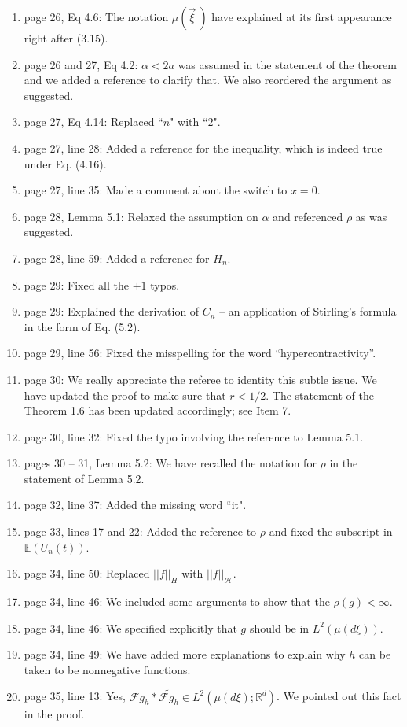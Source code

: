 \documentclass[12pt]{article}%
\theoremstyle{plain}
\theoremstyle{definition}
\def\R{\mathbb{R}}
\newcommand{\Norm}[1]{\left|\left|  #1   \right|\right|}
\numberwithin{equation}{section}
\begin{document}
\begin{enumerate}
  \item[53.] page 26, Eq 4.6: The notation $\mu(\vec{\xi}\:)$ have explained at
    its first appearance right after (3.15).

  \item[54.] page 26 and 27, Eq 4.2: $\alpha < 2a$ was assumed in the statement
    of the theorem and we added a reference to clarify that. We also reordered
    the argument as suggested.
  \item[55.] page 27, Eq 4.14: Replaced ``$n$" with ``$2$".
  \item[56.] page 27, line 28: Added a reference for the inequality, which is
    indeed true under Eq. (4.16).
  \item[57.] page 27, line 35: Made a comment about the switch to $x=0$.

  \item[58.] page 28, Lemma 5.1: Relaxed the assumption on $\alpha$ and
    referenced $\rho$ as was suggested.

  \item[59.] page 28, line 59: Added a reference for $H_n$.

  \item[60.] page 29: Fixed all the $+1$ typos.
  \item[61.] page 29: Explained the derivation of $C_n$ -- an application of Stirling's formula in
    the form of Eq. (5.2).
  \item[62.] page 29, line 56: Fixed the misspelling for the word ``hypercontractivity''.

  \item[63.] page 30: We really appreciate the referee to identity this subtle issue. We have
    updated the proof to make sure that $r<1/2$. The statement of the Theorem 1.6 has been updated
    accordingly; see Item 7.
  \item[64.] page 30, line 32: Fixed the typo involving the reference to Lemma 5.1.

  \item[65.] pages 30 -- 31, Lemma 5.2: We have recalled the notation for
    $\rho$ in the statement of Lemma 5.2.

  \item[66.] page 32, line 37: Added the missing word ``it".
  \item[67.] page 33, lines 17 and 22: Added the reference to $\rho$ and fixed the subscript in
    $\mathbb{E}(U_n(t))$.
  \item[68.] page 34, line 50: Replaced $\Norm{f}_H$ with $\Norm{f}_\mathcal{H}$.
  \item[69.] page 34, line 46: We included some arguments to show that the $\rho(g)<\infty$.
  \item[70.] page 34, line 46: We specified explicitly that $g$ should be in $L^2(\mu(d\xi))$.
  \item[71.] page 34, line 49: We have added more explanations to explain why $h$ can be taken to
    be nonnegative functions.
  \item[72.] page 35, line 13: Yes, $\mathcal{F}g_h * \widetilde{\mathcal{F}g_h}\in
    L^2\left(\mu(d\xi);\R^d\right)$. We pointed out this fact in the proof.


\end{enumerate}
\end{document}
